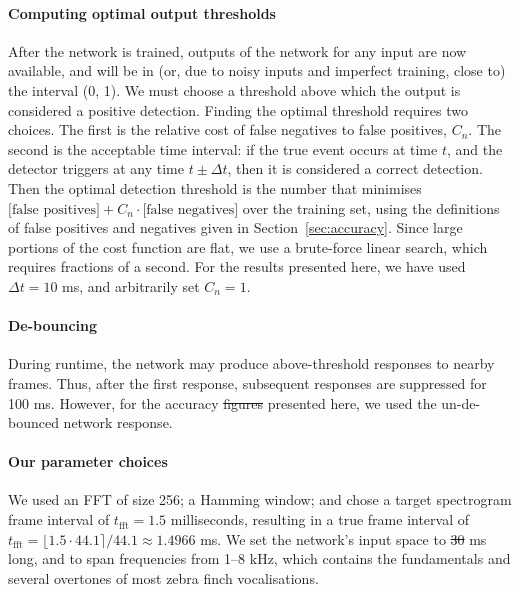 \documentclass[10pt,letterpaper]{article}
\renewcommand{\subsubsection}[1]{\paragraph{#1}}
\providecommand{\DIFaddtex}[1]{{\protect\color{blue}\uwave{#1}}} %
\providecommand{\DIFdeltex}[1]{{\protect\color{red}\sout{#1}}}                      %
\providecommand{\DIFaddbegin}{} %
\providecommand{\DIFaddend}{} %
\providecommand{\DIFdelbegin}{} %
\providecommand{\DIFdelend}{} %
\providecommand{\DIFadd}[1]{\texorpdfstring{\DIFaddtex{#1}}{#1}} %
\providecommand{\DIFdel}[1]{\texorpdfstring{\DIFdeltex{#1}}{}} %
\begin{document}
\subsubsection{Computing optimal output thresholds}
\label{sec:optimalthresholds}
After the network is trained, outputs of the network for any input are
now available, and will be in (or, due to noisy inputs and imperfect
training, close to) the interval (0, 1). We must choose a threshold
above which the output is considered a positive detection. Finding the
optimal threshold requires two choices. The first is the relative cost
of false negatives to false positives, $C_n$. The second is the
acceptable time interval: if the true event occurs at time $t$, and
the detector triggers at any time $t\pm\Delta t$, then it is
considered a correct detection. Then the optimal detection threshold
is the number that minimises $\textrm{[false positives]}
+C_n\cdot\textrm{[false negatives]}$ over the training set, using the
definitions of false positives and negatives given in
Section~\ref{sec:accuracy}. Since large portions of the cost function
are flat, we use a brute-force linear search, which requires fractions of a
second. For the results presented here, we have used
$\Delta t=10$ ms, and arbitrarily set $C_n=1$.

\subsubsection{De-bouncing}

During runtime, the network may produce above-threshold responses to
nearby frames.  Thus, after the first response, subsequent responses
are suppressed for 100 ms.  However, for the accuracy \DIFdelbegin \DIFdel{figures }\DIFdelend \DIFaddbegin \DIFadd{measurements
}\DIFaddend presented here, we used the un-de-bounced network response.

\subsubsection{Our parameter choices}

We used an FFT of size 256; a Hamming window; and chose a target
spectrogram frame interval of $t_\textrm{fft}=1.5$ milliseconds,
resulting in a true frame interval of $t_\textrm{fft}=\lfloor 1.5\cdot
44.1\rceil /44.1\approx 1.4966$ ms.  We set the network's input space
to \DIFdelbegin \DIFdel{30 }\DIFdelend \DIFaddbegin \DIFadd{50 }\DIFaddend ms long, and to span frequencies from 1--8 kHz, which contains
the fundamentals and several overtones of most zebra finch
vocalisations.
\end{document}
